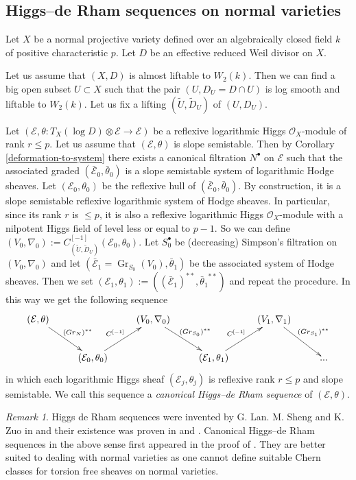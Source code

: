\documentclass[12pt]{article}
\theoremstyle{plain}
\theoremstyle{definition}
\theoremstyle{remark}
\newtheorem{Remark}[Thm]{Remark}
\newcommand{\cE}{{\mathcal E}}
\newcommand{\cO}{{\mathcal O}}
\newcommand{\Gr}{{\mathop{Gr}}}
\begin{document}
\subsection{Higgs--de Rham sequences on normal varieties}

Let $X$ be a normal projective variety defined over an algebraically closed field $k$ of positive characteristic $p$.
Let $D$ be an effective reduced Weil divisor on $X$.

 Let us assume that $(X, D)$ is almost liftable to $W_2(k)$. Then we can
 find a big open subset $U\subset X$ such that the pair
$(U, D_U=D\cap U)$ is log smooth and liftable to $W_2(k)$. Let us fix
 a lifting $(\tilde U, \tilde D_U)$ of $(U, D_U)$. 

\medskip

Let $(\cE, \theta : T_X (\log D)\otimes \cE\to \cE)$ be a  reflexive logarithmic Higgs
 $\cO_X$-module of rank $r\le p$. Let us assume that $(\cE, \theta)$ is slope semistable. Then
 by Corollary \ref{deformation-to-system} there exists a canonical filtration
 $N^{\bullet}$ on $\cE$ such that the associated graded $(\bar \cE_0, \bar \theta _0) $
  is a slope semistable system of logarithmic Hodge sheaves. 
  Let $(\cE_0, \theta_0)$ be the reflexive hull of $(\bar \cE_0, \bar \theta _0) $. By construction, 
 it is a slope semistable reflexive logarithmic system of Hodge sheaves. In particular, since its rank $r$ is $\le p$,
 it is also  a reflexive logarithmic Higgs $\cO_X$-module with a nilpotent Higgs field of level less or equal
 to $p-1$. So we can define 
$(V_{0}, \nabla _0):= C_{(\tilde U,\tilde D_U)}^{[-1]} (\cE_0, \theta _0) $.  
Let $S_0^{\bullet}$  be (decreasing) Simpson's filtration on $(V _0, \nabla _0) $ and let 
$(\bar \cE_1=\Gr_{S_0}(V _0),\bar \theta _1 ) $ be the associated system of Hodge sheaves. Then we set $(\cE_1,\theta_1):=((\bar \cE_1)^{**},
{\bar \theta_1}^{**} )$ and repeat the procedure. In this way we get the following sequence
$${  \xymatrix{
		(\cE, \theta) \ar[rd]^{(\Gr _{N})^{**}}	&& (V_0, \nabla _0)\ar[rd]^{(\Gr _{S_0})^{**}}&& (V_1, \nabla _1)\ar[rd]^{(\Gr _{S_1})^{**}}&\\
	&	(\cE_0, \theta _0)\ar[ru]^{C^{[-1]}}&&	(\cE_1, \theta_1)\ar[ru]^{C^{[-1]}}&&...\\
}}$$
in which  each logarithmic Higgs sheaf  $(\cE_j, \theta_j)$ is reflexive rank $r\le p$  and slope semistable.
We call this sequence a \emph{canonical Higgs--de Rham sequence} of $(\cE, \theta)$.

\medskip

\begin{Remark}
Higgs de Rham sequences were invented by G. Lan. M. Sheng and K. Zuo in \cite{LSZ} and their existence was proven in \cite{LSZ} and \cite{La2}. Canonical Higgs--de Rham sequences in the above sense first appeared in the proof of \cite[Lemma 3.10]{La5}. They are better suited to dealing with normal varieties as one cannot define suitable Chern classes for torsion free sheaves on normal varieties.
\end{Remark}
\end{document}
